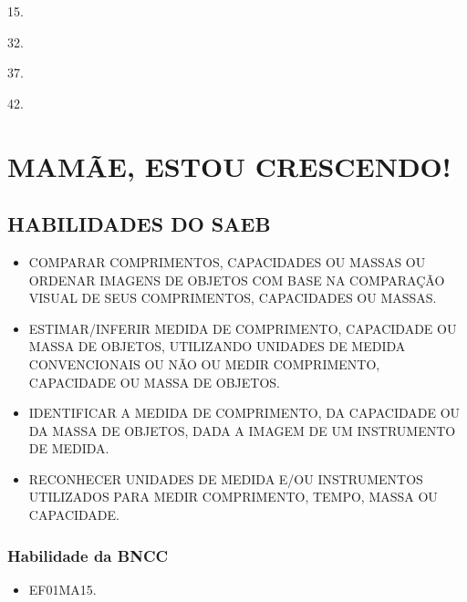 \begin{multicols}{2}
\begin{escolha}
\item
  15.
\item
  32.
\item
  37.
\item
  42.
\end{escolha}
\end{multicols}

\chapter{MAMÃE, ESTOU CRESCENDO!}


\section*{HABILIDADES DO SAEB}

\begin{itemize}
\item
  \uppercase{Comparar comprimentos, capacidades ou massas ou ordenar imagens de
  objetos com base na comparação visual de seus comprimentos,
  capacidades ou massas.}
\item
  \uppercase{Estimar/inferir medida de comprimento, capacidade ou massa de objetos,
  utilizando unidades de medida convencionais ou não ou medir
  comprimento, capacidade ou massa de objetos.}
\item
  \uppercase{Identificar a medida de comprimento, da capacidade ou da massa de
  objetos, dada a imagem de um instrumento de medida.}
\item
  \uppercase{Reconhecer unidades de medida e/ou instrumentos utilizados para medir
  comprimento, tempo, massa ou capacidade.}
\end{itemize}

\subsection{Habilidade da BNCC}

\begin{itemize}
\item EF01MA15.
\end{itemize}



